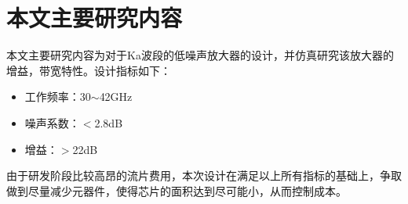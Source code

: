 \section{本文主要研究内容}

本文主要研究内容为对于Ka波段的低噪声放大器的设计，并仿真研究该放大器的增益，带宽特性。设计指标如下：
\begin{itemize}
	\item 工作频率：30$\sim$42GHz
	\item 噪声系数：$<$2.8dB
	\item 增益：$>$22dB
\end{itemize}

由于研发阶段比较高昂的流片费用，本次设计在满足以上所有指标的基础上，争取做到尽量减少元器件，使得芯片的面积达到尽可能小，从而控制成本。